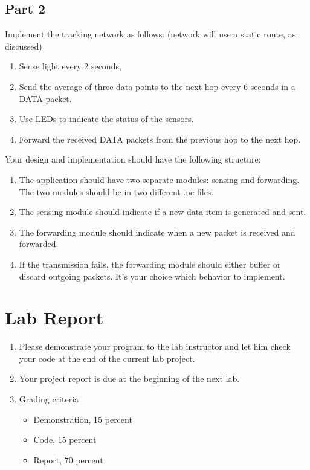 \documentclass[letterpaper,12pt]{article}
\begin{document}
\subsection*{Part 2}
Implement the tracking network as follows: (network will use a static route, as discussed)
\begin{enumerate}
    \item Sense light every 2 seconds,
    \item Send the average of three data points to the next hop every 6 seconds in a DATA packet.
    \item Use LEDs to indicate the status of the sensors.
    \item Forward the received DATA packets from the previous hop to the next hop.
\end{enumerate}

Your design and implementation should have the following structure:
\begin{enumerate}
    \item The application should have two separate modules: sensing and forwarding.
       The two modules should be in two different .nc files.
    \item The sensing module should indicate if a new data item is generated and sent.
    \item The forwarding module should indicate when a new packet is received and forwarded.
    \item If the transmission fails, the forwarding module should either buffer or discard
       outgoing packets. It's your choice which behavior to implement.
\end{enumerate}


\section*{Lab Report}
\begin{enumerate}
   \item Please demonstrate your program to the lab instructor and let him check your code at the end of the current lab project.
   \item Your project report is due at the beginning of the next lab.
   \item Grading criteria
      \begin{itemize}
         \item Demonstration, 15 percent
         \item Code, 15 percent
         \item Report, 70 percent
      \end{itemize}
\end{enumerate}
\end{document}

